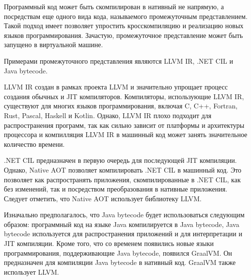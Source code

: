 Программный код может быть скомпилирован в нативный не напрямую, а посредствам еще одного вида кода, называемого промежуточным представлением.
Такой подход имеет позволяет упростить кросскомпиляцию и реализацию новых языков программирования. 
Зачастую, промежуточное представление может быть запущено в виртуальной машине.

Примерами промежуточного представления являются LLVM IR, .NET CIL и Java bytecode.

LLVM IR создан в рамках проекта LLVM и значительно упрощает процесс создания обычных и JIT компиляторов. 
Компиляторы, использующие LLVM IR, существуют для многих языков программирования, включая C, C++, Fortran, Rust, Pascal, Haskell и Kotlin. 
Однако, LLVM IR плохо подходит для распространения программ, так как сильно зависит от платформы и архитектуры процессора и компилляция LLVM IR в машинный код может занять значительное количество времени.

.NET CIL предназначен в первую очередь для последующей JIT компиляции. 
Однако, Native AOT позволяет компилировать .NET CIL в машинный код.
Это позволяет как распространять приложения, скомпилированные в .NET CIL, как без изменений, так и посредством преобразования в нативные приложения.
Следует отметить, что Native AOT использует библиотеку LLVM.

Изначально предполагалось, что Java bytecode будет использоваться следующим образом: программный код на языке Java компилируется в Java bytecode, Java bytecode используется для распространения приложений и для интерпретации и JIT компиляции.
Кроме того, что со временем появились новые языки программирования, поддерживающие Java bytecode, появился GraalVM.
Он предназначен для компиляции Java bytecode в нативный код.
GraalVM также использует LLVM.
